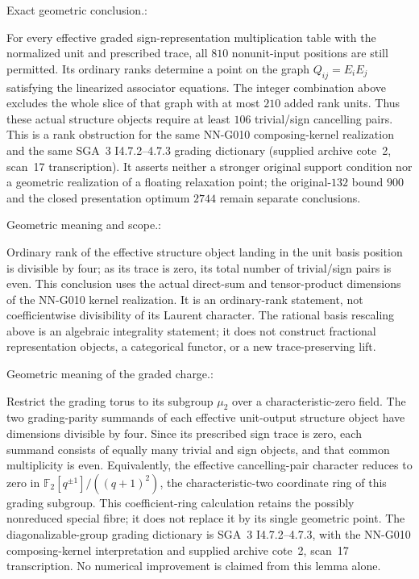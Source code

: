 \begin{geometricstatement}[NN-G037]
Exact geometric conclusion.:

For every effective graded sign-representation multiplication
table with the normalized unit and prescribed trace, all $810$
nonunit-input positions are still permitted.  Its ordinary ranks
determine a point on the graph $Q_{ij}=E_iE_j$ satisfying the
linearized associator equations.  The integer combination above
excludes the whole slice of that graph with at most $210$ added
rank units.  Thus these actual structure objects require at least
$106$ trivial/sign cancelling pairs.  This is a rank obstruction
for the same NN-G010 composing-kernel realization and the same
SGA~3 I4.7.2--4.7.3 grading dictionary (supplied archive cote~2,
scan~17 transcription).  It asserts neither a stronger original
support condition nor a geometric realization of a floating
relaxation point; the original-$132$ bound $900$ and the closed
presentation optimum $2744$ remain separate conclusions.


Geometric meaning and scope.:

Ordinary rank of the effective structure object landing in the
unit basis position is divisible by four; as its trace is zero,
its total number of trivial/sign pairs is even.
This conclusion uses the actual direct-sum and tensor-product
dimensions of the NN-G010 kernel realization.  It is an ordinary-rank
statement, not coefficientwise divisibility of its Laurent character.
The rational basis rescaling above is an algebraic integrality
statement; it does not construct fractional representation objects,
a categorical functor, or a new trace-preserving lift.


Geometric meaning of the graded charge.:

Restrict the grading torus to its subgroup $\mu_2$ over a
characteristic-zero field.  The two grading-parity summands
of each effective unit-output structure object have dimensions
divisible by four.  Since its prescribed sign trace is zero,
each summand consists of equally many trivial and sign objects,
and that common multiplicity is even.  Equivalently, the
effective cancelling-pair character reduces to zero in
$\mathbb F_2[q^{\pm1}]/((q+1)^2)$, the characteristic-two
coordinate ring of this grading subgroup.  This coefficient-ring
calculation retains the possibly nonreduced special fibre; it
does not replace it by its single geometric point.  The
diagonalizable-group grading dictionary is SGA~3 I4.7.2--4.7.3,
with the NN-G010 composing-kernel interpretation and supplied
archive cote~2, scan~17 transcription.  No numerical improvement is claimed from this lemma alone.



\end{geometricstatement}
